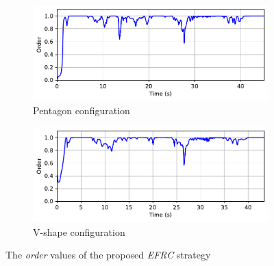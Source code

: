 \begin{figure}[!h]
\begin{subfigure}[b]{0.49\textwidth}
    
    \centering
    \includegraphics[width=\linewidth]{paper2/images/order_edc_shape1.pdf}
    \caption{Pentagon configuration}
    \label{fig:1order_edc1}
\end{subfigure}
\begin{subfigure}[b]{0.49\textwidth}
    \centering
    \includegraphics[width=\linewidth]{paper2/images/order_edc_shape2.pdf}
    \caption{V-shape configuration}
    \label{fig:1order_edc2}
\end{subfigure}
\caption{The \textit{order} values of the proposed \textit{EFRC} strategy}
\label{fig:1order}
\end{figure}

